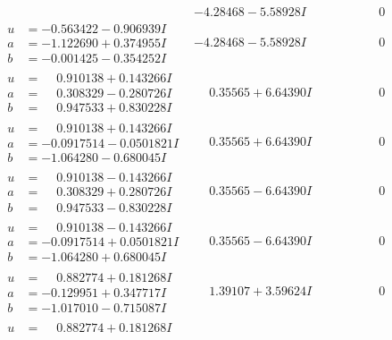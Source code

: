 \documentclass[1p]{elsarticle_modified}
\theoremstyle{definition}
\begin{document}
$$\begin{array}{c|c|c}
 & -4.28468 - 5.58928 I & \phantom{-0.000000 } 0 \\ \hline\begin{aligned}
u &= -0.563422 - 0.906939 I \\
a &= -1.122690 + 0.374955 I \\
b &= -0.001425 - 0.354252 I\end{aligned}
 & -4.28468 - 5.58928 I & \phantom{-0.000000 } 0 \\ \hline\begin{aligned}
u &= \phantom{-}0.910138 + 0.143266 I \\
a &= \phantom{-}0.308329 - 0.280726 I \\
b &= \phantom{-}0.947533 + 0.830228 I\end{aligned}
 & \phantom{-}0.35565 + 6.64390 I & \phantom{-0.000000 } 0 \\ \hline\begin{aligned}
u &= \phantom{-}0.910138 + 0.143266 I \\
a &= -0.0917514 - 0.0501821 I \\
b &= -1.064280 - 0.680045 I\end{aligned}
 & \phantom{-}0.35565 + 6.64390 I & \phantom{-0.000000 } 0 \\ \hline\begin{aligned}
u &= \phantom{-}0.910138 - 0.143266 I \\
a &= \phantom{-}0.308329 + 0.280726 I \\
b &= \phantom{-}0.947533 - 0.830228 I\end{aligned}
 & \phantom{-}0.35565 - 6.64390 I & \phantom{-0.000000 } 0 \\ \hline\begin{aligned}
u &= \phantom{-}0.910138 - 0.143266 I \\
a &= -0.0917514 + 0.0501821 I \\
b &= -1.064280 + 0.680045 I\end{aligned}
 & \phantom{-}0.35565 - 6.64390 I & \phantom{-0.000000 } 0 \\ \hline\begin{aligned}
u &= \phantom{-}0.882774 + 0.181268 I \\
a &= -0.129951 + 0.347717 I \\
b &= -1.017010 - 0.715087 I\end{aligned}
 & \phantom{-}1.39107 + 3.59624 I & \phantom{-0.000000 } 0 \\ \hline\begin{aligned}
u &= \phantom{-}0.882774 + 0.181268 I \\

\end{aligned}
\end{array}$$
\end{document}
